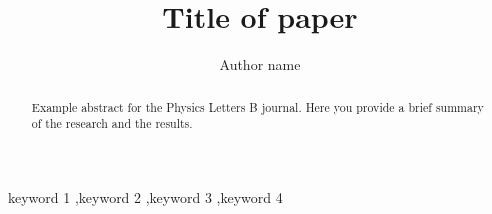 \documentclass[final,5p,times,twocolumn,authoryear]{elsarticle}
\begin{document}
\begin{frontmatter}



\title{Title of paper}


\author[first]{Author name}

\begin{abstract}
Example abstract for the Physics Letters B journal. Here you provide a brief summary of the research and the results.
\end{abstract}



\begin{keyword}
keyword 1 \sep keyword 2 \sep keyword 3 \sep keyword 4



\end{keyword}


\end{frontmatter}
\end{document}
